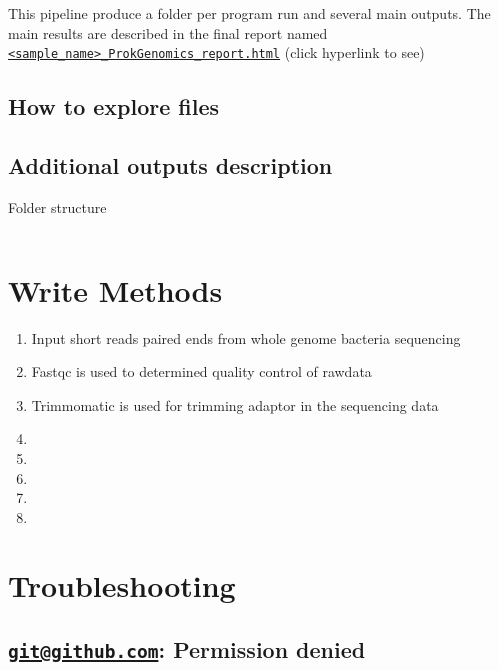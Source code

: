 \documentclass[
]{book}
\providecommand{\tightlist}{%
  \setlength{\itemsep}{0pt}\setlength{\parskip}{0pt}}
\begin{document}
This pipeline produce a folder per program run and several main outputs. The main results are described in the final report named \href{https://bioinformatics.erc.monash.edu/home/lper0012/ProkGenomics/1-77321-LFA6246_L2_ProkGenomics_report.html}{\texttt{\textless{}sample\_name\textgreater{}\_ProkGenomics\_report.html}} (click hyperlink to see)

\hypertarget{how-to-explore-files}{%
\section{How to explore files}\label{how-to-explore-files}}

\hypertarget{additional-outputs-description}{%
\section{Additional outputs description}\label{additional-outputs-description}}

Folder structure

\begin{verbatim}
\end{verbatim}

\hypertarget{write-methods}{%
\chapter{Write Methods}\label{write-methods}}

\begin{enumerate}
\def\labelenumi{\arabic{enumi}.}
\tightlist
\item
  Input short reads paired ends from whole genome bacteria sequencing
\item
  Fastqc is used to determined quality control of rawdata
\item
  Trimmomatic is used for trimming adaptor in the sequencing data
\item
\item
\item
\item
\item
\end{enumerate}

\hypertarget{troubleshooting}{%
\chapter{Troubleshooting}\label{troubleshooting}}

\hypertarget{gitgithub.com-permission-denied}{%
\section{\texorpdfstring{\href{mailto:git@github.com}{\nolinkurl{git@github.com}}: Permission denied}{git@github.com: Permission denied}}\label{gitgithub.com-permission-denied}}
\end{document}
